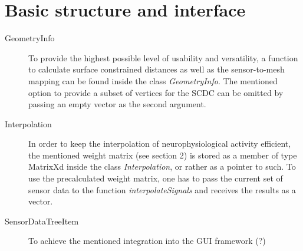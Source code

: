 \documentclass[a4paper, 11pt, english, fleqn]{article}
\begin{document}
\section{Basic structure and interface}

\begin{description}
	\item[GeometryInfo] To provide the highest possible level of usability and versatility, a function to calculate surface constrained distances as well as the sensor-to-mesh mapping can be found inside the class \textit{GeometryInfo}. The mentioned option to provide a subset of vertices for the SCDC can be omitted by passing an empty vector as the second argument. 


\item[Interpolation] In order to keep the interpolation of neurophysiological activity efficient, the mentioned weight matrix (see section 2) is stored as a member of type MatrixXd inside the class \textit{Interpolation}, or rather as a pointer to such.
To use the precalculated weight matrix, one has to pass the current set of sensor data to the function \textit{interpolateSignals} and receives the results as a vector.


\item[SensorDataTreeItem] To achieve the mentioned integration into the GUI framework (?)

\end{description}

\clearpage
  
\end{document}

